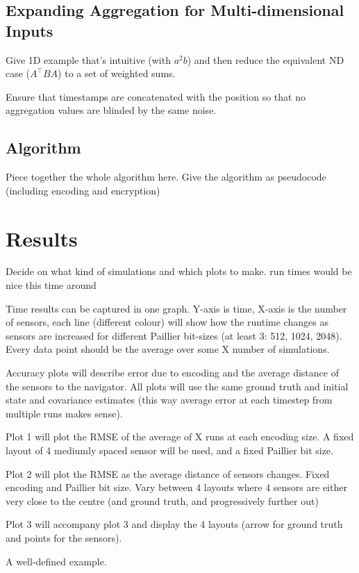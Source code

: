 \documentclass[twocolumn]{autart}    %
\begin{document}
\subsection{Expanding Aggregation for Multi-dimensional Inputs}
Give 1D example that's intuitive (with $a^2b$) and then reduce the equivalent ND case ($A^\top BA$) to a set of weighted sums.

Ensure that timestamps are concatenated with the position so that no aggregation values are blinded by the same noise.

\subsection{Algorithm}
Piece together the whole algorithm here.
Give the algorithm as pseudocode (including encoding and encryption)


\section{Results}
Decide on what kind of simulations and which plots to make. run times would be nice this time around

Time results can be captured in one graph. Y-axis is time, X-axis is the number of sensors, each line (different colour) will show how the runtime changes as sensors are increased for different Paillier bit-sizes (at least 3: 512, 1024, 2048). Every data point should be the average over some X number of simulations.

Accuracy plots will describe error due to encoding and the average distance of the sensors to the navigator. All plots will use the same ground truth and initial state and covariance estimates (this way average error at each timestep from multiple runs makes sense).

Plot 1 will plot the RMSE of the average of X runs at each encoding size. A fixed layout of 4 mediumly spaced sensor will be used, and a fixed Paillier bit size.

Plot 2 will plot the RMSE as the average distance of sensors changes. Fixed encoding and Paillier bit size. Vary between 4 layouts where 4 sensors are either very close to the centre (and ground truth, and progressively further out)

Plot 3 will accompany plot 3 and display the 4 layouts (arrow for ground truth and points for the sensors).

A well-defined example.
\end{document}
